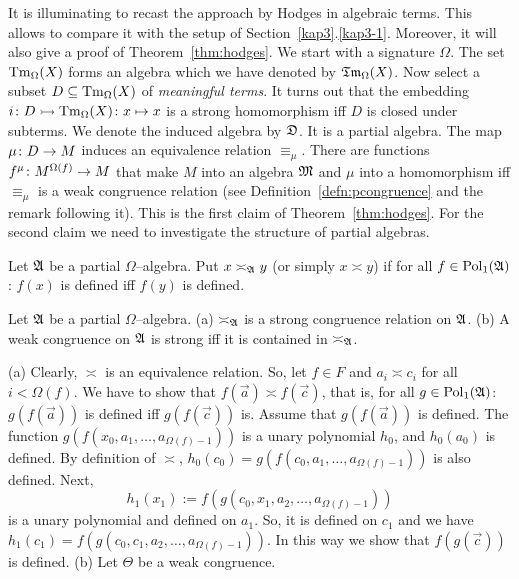 It is illuminating to recast the approach by Hodges in algebraic
terms. This allows to compare it with the setup of
Section~\ref{kap3}.\ref{kap3-1}. Moreover, it will also give a proof of
Theorem~\ref{thm:hodges}. We start with a signature $\Omega$. The
set $\operatorname{Tm}_{\Omega}(X)$ forms an algebra which we have
denoted by $\mathfrak{Tm}_{\Omega}(X)$. Now select a subset $D
\subseteq \operatorname{Tm}_{\Omega}(X)$ of {\it meaningful terms}. It
turns out that the embedding $i \colon D \rightarrowtail \operatorname{Tm}_{\Omega}(X) 
\colon x \mapsto x$ is a strong homomorphism iff 
$D$ is closed under subterms. We denote the induced
algebra by $\mathfrak{D}$. It is a partial algebra. The map $\mu \colon D \rightarrow M$
induces an equivalence relation $\equiv_{\mu}$. There are functions
$f^{\mu} \colon M^{\Omega(f)} \rightarrow M$ that make $M$ into an
algebra $\mathfrak{M}$ and $\mu$ into a homomorphism iff
$\equiv_{\mu}$ is a weak congruence relation (see
Definition~\ref{defn:pcongruence} and the remark following it).
This is the first claim of Theorem~\ref{thm:hodges}. For the
second claim we need to investigate the structure of partial
algebras.
\begin{defn}
\index{$\asymp_{\GA}$, $\asymp$}%
Let $\mathfrak{A}$ be a partial $\Omega$--algebra. Put $x \asymp_{\mathfrak{A}} y$
(or simply $x \asymp y$) if for all $f \in \operatorname{Pol}_1(\mathfrak{A})$:
$f(x)$ is defined iff $f(y)$ is defined.
\end{defn}
\begin{prop}
\label{prop:strongcong}
Let $\mathfrak{A}$ be a partial $\Omega$--algebra.
(a) $\asymp_{\GA}$ is a strong congruence relation on $\mathfrak{A}$. (b) A
weak congruence on $\mathfrak{A}$ is strong iff it is contained
in $\asymp_{\GA}$.
\end{prop}
\proofbeg%
(a) Clearly, $\asymp$ is an equivalence relation. So, let $f \in
F$ and $a_i \asymp c_i$ for all $i < \Omega(f)$. We have to show
that $f(\vec{a}) \asymp f(\vec{c})$, that is, for all $g \in
\operatorname{Pol}_1(\mathfrak{A})$: $g(f(\vec{a}))$ is defined iff
$g(f(\vec{c}))$ is. Assume that $g(f(\vec{a}))$ is defined. The
function $g(f(x_0, a_1, \dotsc, a_{\Omega(f)-1}))$ is a unary
polynomial $h_0$, and $h_0(a_0)$ is defined. By definition of
$\asymp$, $h_0(c_0) = g(f(c_0, a_1, \dotsc, a_{\Omega(f)-1}))$ 
is also defined. Next, 
\begin{equation}
h_1(x_1) := f(g(c_0, x_1, a_2, \dotsc, a_{\Omega(f)-1}))
\end{equation}
is a unary polynomial and defined on $a_1$. So, it is defined on $c_1$ 
and we have $h_1(c_1) = f(g(c_0,
c_1, a_2, \dotsc, a_{\Omega(f)-1}))$. In this way we show that
$f(g(\vec{c}))$ is defined. (b) Let $\Theta$ be a weak congruence.
